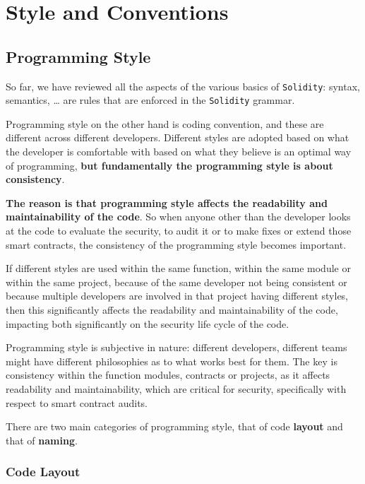 \section{Style and Conventions}\label{style-and-conventions}

\subsection{Programming Style}\label{programming-style}

So far, we have reviewed all the aspects of the various basics of
\texttt{Solidity}: syntax, semantics, \ldots{} are rules that are
enforced in the \texttt{Solidity} grammar.

Programming style on the other hand is coding convention, and these are
different across different developers. Different styles are adopted
based on what the developer is comfortable with based on what they
believe is an optimal way of programming, \textbf{but fundamentally the
programming style is about consistency}.

\textbf{The reason is that programming style affects the readability and
maintainability of the code}. So when anyone other than the developer
looks at the code to evaluate the security, to audit it or to make fixes
or extend those smart contracts, the consistency of the programming
style becomes important.

If different styles are used within the same function, within the same
module or within the same project, because of the same developer not
being consistent or because multiple developers are involved in that
project having different styles, then this significantly affects the
readability and maintainability of the code, impacting both
significantly on the security life cycle of the code.

Programming style is subjective in nature: different developers,
different teams might have different philosophies as to what works best
for them. The key is consistency within the function modules, contracts
or projects, as it affects readability and maintainability, which are
critical for security, specifically with respect to smart contract
audits.

There are two main categories of programming style, that of code
\textbf{layout} and that of \textbf{naming}.

\subsubsection{Code Layout}\label{code-layout}


